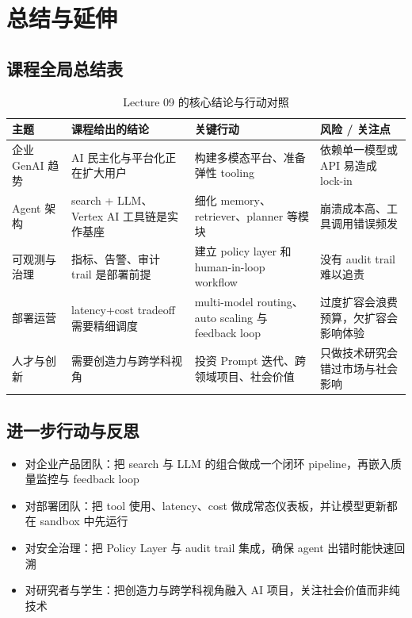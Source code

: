 \section{总结与延伸}

\subsection{课程全局总结表}

\begin{table}[H]
\centering
\begin{tabular}{p{} p{} p{} p{}}
\toprule
主题 & 课程给出的结论 & 关键行动 & 风险 / 关注点 \\
\midrule
企业 GenAI 趋势 & AI 民主化与平台化正在扩大用户 & 构建多模态平台、准备弹性 tooling & 依赖单一模型或 API 易造成 lock-in \\
Agent 架构 & search + LLM、Vertex AI 工具链是实作基座 & 细化 memory、retriever、planner 等模块 & 崩溃成本高、工具调用错误频发 \\
可观测与治理 & 指标、告警、审计 trail 是部署前提 & 建立 policy layer 和 human-in-loop workflow & 没有 audit trail 难以追责 \\
部署运营 & latency+cost tradeoff 需要精细调度 & multi-model routing、auto scaling 与 feedback loop & 过度扩容会浪费预算，欠扩容会影响体验 \\
人才与创新 & 需要创造力与跨学科视角 & 投资 Prompt 迭代、跨领域项目、社会价值 & 只做技术研究会错过市场与社会影响 \\
\bottomrule
\end{tabular}
\caption{Lecture 09 的核心结论与行动对照}
\end{table}

\subsection{进一步行动与反思}

\begin{itemize}
    \item 对企业产品团队：把 search 与 LLM 的组合做成一个闭环 pipeline，再嵌入质量监控与 feedback loop
    \item 对部署团队：把 tool 使用、latency、cost 做成常态仪表板，并让模型更新都在 sandbox 中先运行
    \item 对安全治理：把 Policy Layer 与 audit trail 集成，确保 agent 出错时能快速回溯
    \item 对研究者与学生：把创造力与跨学科视角融入 AI 项目，关注社会价值而非纯技术
\end{itemize}

